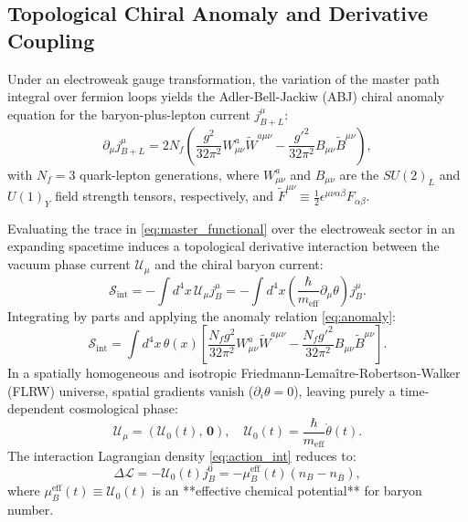 \documentclass[11pt,a4paper]{article}
\begin{document}
\subsection{Topological Chiral Anomaly and Derivative Coupling}
Under an electroweak gauge transformation, the variation of the master path integral over fermion loops yields the Adler-Bell-Jackiw (ABJ) chiral anomaly equation for the baryon-plus-lepton current $j_{B+L}^\mu$:
\begin{equation}
\partial_\mu j_{B+L}^\mu = 2 N_f \left( \frac{g^2}{32\pi^2} W_{\mu\nu}^a \tilde{W}^{a\mu\nu} - \frac{g'^2}{32\pi^2} B_{\mu\nu} \tilde{B}^{\mu\nu} \right),
\label{eq:anomaly}
\end{equation}
with $N_f = 3$ quark-lepton generations, where $W_{\mu\nu}^a$ and $B_{\mu\nu}$ are the $SU(2)_L$ and $U(1)_Y$ field strength tensors, respectively, and $\tilde{F}^{\mu\nu} \equiv \frac{1}{2} \epsilon^{\mu\nu\alpha\beta} F_{\alpha\beta}$.

Evaluating the trace in \eqref{eq:master_functional} over the electroweak sector in an expanding spacetime induces a topological derivative interaction between the vacuum phase current $\mathcal{U}_\mu$ and the chiral baryon current:
\begin{equation}
\mathcal{S}_{\mathrm{int}} = - \int d^4x \, \mathcal{U}_\mu j_B^\mu = - \int d^4x \left( \frac{\hbar}{m_{\mathrm{eff}}} \partial_\mu \theta \right) j_B^\mu.
\label{eq:action_int}
\end{equation}
Integrating by parts and applying the anomaly relation \eqref{eq:anomaly}:
\begin{equation}
\mathcal{S}_{\mathrm{int}} = \int d^4x \, \theta(x) \left[ \frac{N_f g^2}{32\pi^2} W_{\mu\nu}^a \tilde{W}^{a\mu\nu} - \frac{N_f g'^2}{32\pi^2} B_{\mu\nu} \tilde{B}^{\mu\nu} \right].
\end{equation}
In a spatially homogeneous and isotropic Friedmann-Lema\^itre-Robertson-Walker (FLRW) universe, spatial gradients vanish ($\partial_i \theta = 0$), leaving purely a time-dependent cosmological phase:
\begin{equation}
\mathcal{U}_\mu = (\mathcal{U}_0(t), \, \mathbf{0}), \quad \mathcal{U}_0(t) = \frac{\hbar}{m_{\mathrm{eff}}} \dot{\theta}(t).
\end{equation}
The interaction Lagrangian density \eqref{eq:action_int} reduces to:
\begin{equation}
\Delta \mathcal{L} = - \mathcal{U}_0(t) j_B^0 = - \mu_B^{\mathrm{eff}}(t) (n_B - n_{\bar{B}}),
\label{eq:lagrangian_eff}
\end{equation}
where $\mu_B^{\mathrm{eff}}(t) \equiv \mathcal{U}_0(t)$ is an **effective chemical potential** for baryon number.
\end{document}
